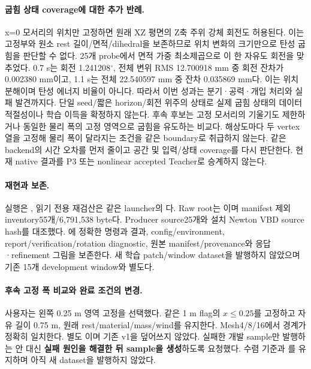 \documentclass[10pt]{article}
\begin{document}
\paragraph{굽힘 상태 coverage에 대한 추가 반례.}
x=0 모서리의 위치만 고정하면 원래 XZ 평면의 Z축 주위 강체 회전도 허용된다.
이는 고정부와 원소 rest 길이/면적/dihedral을 보존하므로 위치 변화의 크기만으로 탄성 굽힘을 판단할 수 없다.
25개 probe에서 면적 가중 최소제곱으로 이 한 자유도 회전을 맞추었다.
0.7 s는 회전 1.241208$^\circ$, 전체 변위 RMS 12.700918 mm 중 회전 잔차가 0.002380 mm이고,
1.1 s는 전체 22.540597 mm 중 잔차 0.035869 mm다. 이는 위치 분해이며 탄성 에너지 비율이 아니다.
따라서 이번 성과는 분기·공력·개입 처리와 실패 발견까지다. 단일 seed/짧은 horizon/회전 위주의 상태로
실제 굽힘 상태의 데이터 적절성이나 학습 이득을 확정하지 않는다.
후속 후보는 고정 모서리의 기울기도 제한하거나 동일한 물리 폭의 고정 영역으로 굽힘을 유도하는 비교다.
해상도마다 두 vertex 열을 고정해 물리 폭이 달라지는 조건을 같은 boundary로 취급하지 않는다.
같은 backend의 시간 오차를 먼저 줄이고 공간 및 입력/상태 coverage를 다시 판단한다.
현재 native 결과를 P3 또는 nonlinear accepted Teacher로 승계하지 않는다.

\paragraph{재현과 보존.}
실행은 , 읽기 전용 재검산은 같은 launcher의
다. Raw root는 이며
manifest 제외 inventory55개/6,791,538 byte다. Producer source25개와 설치 Newton VBD source hash를 대조했다.
에 정확한 명령과 결과, config/environment,
report/verification/rotation diagnostic, 원본 manifest/provenance와 응답·refinement 그림을 보존한다.
새 학습 patch/window dataset을 발행하지 않았으며 기존 15개 development window와 별도다.

\paragraph{후속 고정 폭 비교와 완료 조건의 변경.}
사용자는 왼쪽 0.25 m 영역 고정을 선택했다. 같은 1 m flag의 \(x\leq0.25\)를 고정하고
자유 길이 0.75 m, 원래 rest/material/mass/wind를 유지한다. Mesh4/8/16에서 경계가 정확히 일치한다.
별도 이며 기존 v1을 덮어쓰지 않았다.
실패한 개발 sample만 발행하는 안 대신 \textbf{실패 원인을 해결한 뒤 sample을 생성}하도록 요청했다.
수렴 기준과 를 유지하며 아직 새 dataset을 발행하지 않았다.
\end{document}
